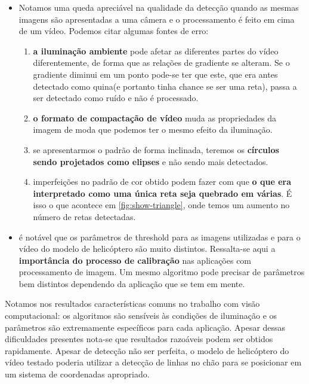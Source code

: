\documentclass[journal]{IEEEtran}
\begin{document}
\begin{itemize}
\item 	Notamos uma queda apreciável na qualidade da detecção quando as mesmas 
	imagens são apresentadas a uma câmera e o processamento é feito em cima de um
	vídeo. Podemos citar algumas fontes de erro:
		\begin{enumerate}
			\item\textbf{ a iluminação ambiente} pode afetar as diferentes partes do vídeo diferentemente,
			de forma que as relações de gradiente se alteram. Se o gradiente diminui em um ponto
			pode-se ter que este, que era antes detectado como quina(e portanto tinha chance se ser
			uma reta), passa a ser detectado como ruído e não é processado.
			\item\textbf{ o formato de compactação de vídeo} muda as propriedades da imagem de moda
			que podemos ter o mesmo efeito da iluminação.
			\item se apresentarmos o padrão de forma inclinada, teremos os \textbf{círculos sendo projetados
			como elipses} e não sendo mais detectados.
			\item imperfeições no padrão de cor obtido podem fazer com que \textbf{o que era interpretado
			como uma única reta seja quebrado em várias}. É isso o que acontece em \ref{fig:show-triangle}, onde temos um aumento no número de retas detectadas.

		\end{enumerate}		
\item 		é notável que os parâmetros de threshold para as imagens utilizadas e para o vídeo
			do modelo de helicóptero são muito distintos. Ressalta-se aqui a \textbf{importância do processo
			de calibração} nas aplicações com processamento de imagem. Um mesmo algoritmo pode
			precisar de parâmetros bem distintos dependendo da aplicação que se tem em mente.
	\end{itemize}
	
	Notamos nos resultados características comuns no trabalho com visão computacional:
	os algoritmos são sensíveis às condições de iluminação e os parâmetros são extremamente
	específicos para cada aplicação. Apesar dessas dificuldades presentes nota-se que resultados
	razoáveis podem ser obtidos rapidamente. Apesar de detecção não ser perfeita, o modelo
	de helicóptero do vídeo testado poderia utilizar a detecção de linhas no chão para se posicionar
	em um sistema de coordenadas apropriado. 
	
\end{document}

